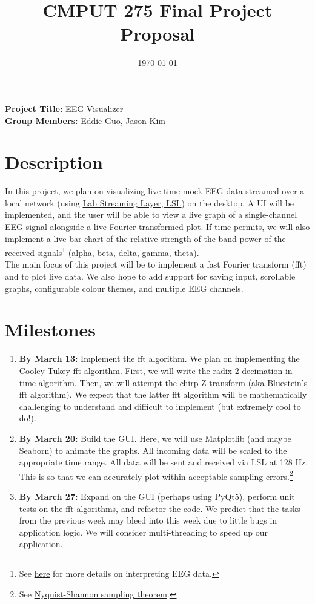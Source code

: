 \documentclass{article}
\title{\Large \textbf{CMPUT 275 Final Project Proposal \vspace{-2em}}}
\date{\today}
\begin{document}
\maketitle
\thispagestyle{fancy}

\flushleft
\textbf{Project Title:} EEG Visualizer\\
\textbf{Group Members:} Eddie Guo, Jason Kim

\section*{Description}
In this project, we plan on visualizing live-time mock EEG data streamed over a local network (using \href{https://labstreaminglayer.readthedocs.io}{Lab Streaming Layer, LSL}) on the desktop. A UI will be implemented, and the user will be able to view a live graph of a single-channel EEG signal alongside a live Fourier transformed plot. If time permits, we will also implement a live bar chart of the relative strength of the band power of the received signals\footnote{See \href{https://raphaelvallat.com/bandpower.html}{here} for more details on interpreting EEG data.} (alpha, beta, delta, gamma, theta).\\[1em]

The main focus of this project will be to implement a fast Fourier transform (fft) and to plot live data. We also hope to add support for saving input, scrollable graphs, configurable colour themes, and multiple EEG channels.

\section*{Milestones}
\begin{enumerate}
    \item \textbf{By March 13:} Implement the fft algorithm. We plan on implementing the Cooley-Tukey fft algorithm. First, we will write the radix-2 decimation-in-time algorithm. Then, we will attempt the chirp Z-transform (aka Bluestein's fft algorithm). We expect that the latter fft algorithm will be mathematically challenging to understand and difficult to implement (but extremely cool to do!).
    \item \textbf{By March 20:} Build the GUI. Here, we will use Matplotlib (and maybe Seaborn) to animate the graphs. All incoming data will be scaled to the appropriate time range. All data will be sent and received via LSL at 128 Hz. This is so that we can accurately plot within acceptable sampling errors.\footnote{See \href{https://en.wikipedia.org/wiki/Nyquist–Shannon_sampling_theorem}{Nyquist-Shannon sampling theorem}.}
    \item \textbf{By March 27:} Expand on the GUI (perhaps using PyQt5), perform unit tests on the fft algorithms, and refactor the code. We predict that the tasks from the previous week may bleed into this week due to little bugs in application logic. We will consider multi-threading to speed up our application.
\end{enumerate}
\end{document}
